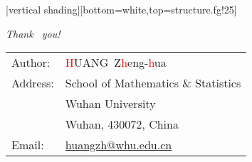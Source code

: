 \documentclass[serif,envcountsect]{beamer}
\begin{document}
[vertical shading][bottom=white,top=structure.fg!25] %
\begin{frame}
 \begin{center}
{\huge \emph{\textcolor[rgb]{0.50,0.00,1.00}{Thank  ~you!}}}\\
\vspace{5mm}\large
\begin{tabular}{ll}
   {\sc Author}: & \textsf{\textcolor{red}{H}UANG\ Z\textcolor{red}{h}eng-\textcolor{red}{h}ua}\\
  {\sc Address}: & School of Mathematics \& Statistics\\
                 & Wuhan University  \\
                 & Wuhan, 430072, China\\
    {\sc Email}: & \href{mailto:huangzh@whu.edu.cn}{\color{blue!70}huangzh@whu.edu.cn}\\
\end{tabular}
 \end{center}
\end{frame}
\end{document}
